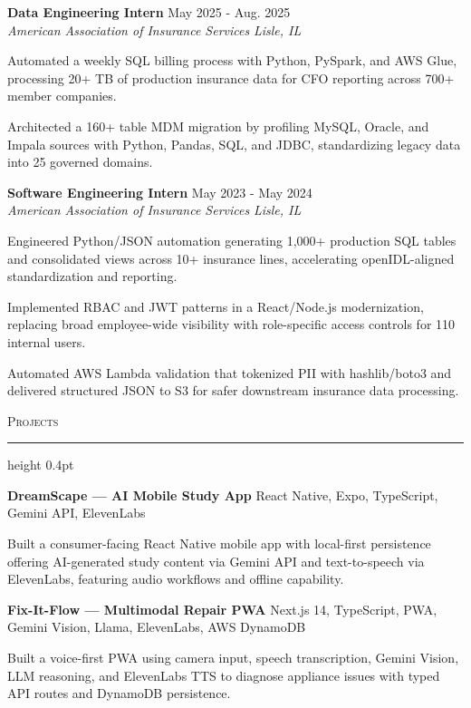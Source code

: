 \documentclass[letterpaper,11pt]{article}
\newcommand{\resumesection}[1]{%
  \par\vspace{2pt}%
  {\large\scshape #1}\par\vspace{2pt}%
  \hrule height 0.4pt\vspace{2pt}%
}
\newcommand{\resumeSubheading}[4]{
  \textbf{#1} \hfill #2\\
  \textit{#3} \hfill \textit{#4}
}
\newcommand{\projectHeading}[2]{
  \textbf{#1} \hfill #2
}
\begin{document}
\resumeSubheading
{Data Engineering Intern}{May 2025 - Aug. 2025}
{American Association of Insurance Services}{Lisle, IL}
\begin{tightitemize}
  \item Automated a weekly SQL billing process with Python, PySpark, and AWS Glue, processing 20+ TB of production insurance data for CFO reporting across 700+ member companies.
  \item Architected a 160+ table MDM migration by profiling MySQL, Oracle, and Impala sources with Python, Pandas, SQL, and JDBC, standardizing legacy data into 25 governed domains.
\end{tightitemize}

\resumeSubheading
{Software Engineering Intern}{May 2023 - May 2024}
{American Association of Insurance Services}{Lisle, IL}
\begin{tightitemize}
  \item Engineered Python/JSON automation generating 1,000+ production SQL tables and consolidated views across 10+ insurance lines, accelerating openIDL-aligned standardization and reporting.
  \item Implemented RBAC and JWT patterns in a React/Node.js modernization, replacing broad employee-wide visibility with role-specific access controls for 110 internal users.
  \item Automated AWS Lambda validation that tokenized PII with hashlib/boto3 and delivered structured JSON to S3 for safer downstream insurance data processing.
\end{tightitemize}

\resumesection{Projects}
\projectHeading{DreamScape — AI Mobile Study App}{React Native, Expo, TypeScript, Gemini API, ElevenLabs}
\begin{tightitemize}
  \item Built a consumer-facing React Native mobile app with local-first persistence offering AI-generated study content via Gemini API and text-to-speech via ElevenLabs, featuring audio workflows and offline capability.
\end{tightitemize}

\vspace{-4pt}
\projectHeading{Fix-It-Flow — Multimodal Repair PWA}{Next.js 14, TypeScript, PWA, Gemini Vision, Llama, ElevenLabs, AWS DynamoDB}
\begin{tightitemize}
  \item Built a voice-first PWA using camera input, speech transcription, Gemini Vision, LLM reasoning, and ElevenLabs TTS to diagnose appliance issues with typed API routes and DynamoDB persistence.
\end{tightitemize}
\end{document}
